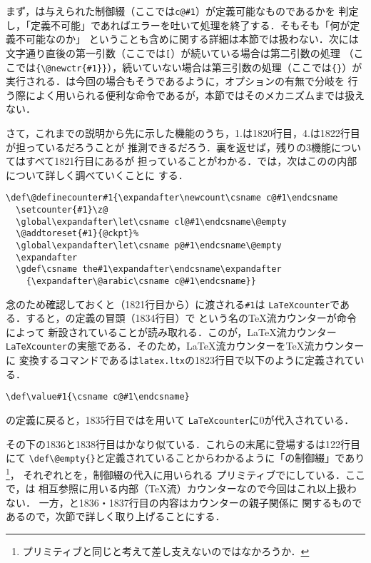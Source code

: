 \documentclass[autodetect-engine,dvipdfmx]{jsarticle}
\begin{document}
まず，は与えられた制御綴（ここでは\verb|c@#1|）が定義可能なものであるかを
判定し，「定義不可能」であればエラーを吐いて処理を終了する．そもそも「何が定義不可能なのか」
ということも含めに関する詳細は本節では扱わない．次には
文字通り直後の第一引数（ここでは\texttt{[}\space）が続いている場合は第二引数の処理
（ここでは\verb|{\@newctr{#1}}|），続いていない場合は第三引数の処理（ここでは\verb|{}|）が
実行される．は今回の場合もそうであるように，オプションの有無で分岐を
行う際によく用いられる便利な命令であるが，本節ではそのメカニズムまでは扱えない．

さて，これまでの説明から先に示した機能のうち，1.は1820行目，4.は1822行目が担っているだろうことが
推測できるだろう．裏を返せば，残りの3機能についてはすべて1821行目にあるが
担っていることがわかる．では，次はこのの内部について詳しく調べていくことに
する．

\newpage

\begin{lstlisting}[firstnumber=1834]
\def\@definecounter#1{\expandafter\newcount\csname c@#1\endcsname
  \setcounter{#1}\z@
  \global\expandafter\let\csname cl@#1\endcsname\@empty
  \@addtoreset{#1}{@ckpt}%
  \global\expandafter\let\csname p@#1\endcsname\@empty
  \expandafter
  \gdef\csname the#1\expandafter\endcsname\expandafter
    {\expandafter\@arabic\csname c@#1\endcsname}}
\end{lstlisting}

念のため確認しておくと（1821行目から）に渡される\verb|#1|は
\texttt{LaTeXcounter}である．すると，の定義の冒頭（1834行目）で
という名の\TeX 流カウンターが命令\linebreak によって
新設されていることが読み取れる．このが，\LaTeX 流カウンター
\texttt{LaTeXcounter}の実態である．そのため，\LaTeX 流カウンターを\TeX 流カウンターに
変換するコマンドであるは\texttt{latex.ltx}の1823行目で以下のように定義されている．

\begin{lstlisting}[firstnumber=1823]
\def\value#1{\csname c@#1\endcsname}
\end{lstlisting}

の定義に戻ると，1835行目ではを用いて
\texttt{LaTeXcounter}に0が代入されている．

その下の1836と1838行目はかなり似ている．これらの末尾に登場するは122行目にて
\verb|\def\@empty{}|と定義されていることからわかるように「の制御綴」であり
\footnote{プリミティブと同じと考えて差し支えないのではなかろうか．}，
それぞれとを，制御綴の代入に用いられる
プリミティブでにしている．ここで，は
相互参照に用いる内部（\TeX 流）カウンターなので今回はこれ以上扱わない．
一方，と1836・1837行目の内容はカウンターの親子関係に
関するものであるので，次節で詳しく取り上げることにする．
\end{document}
